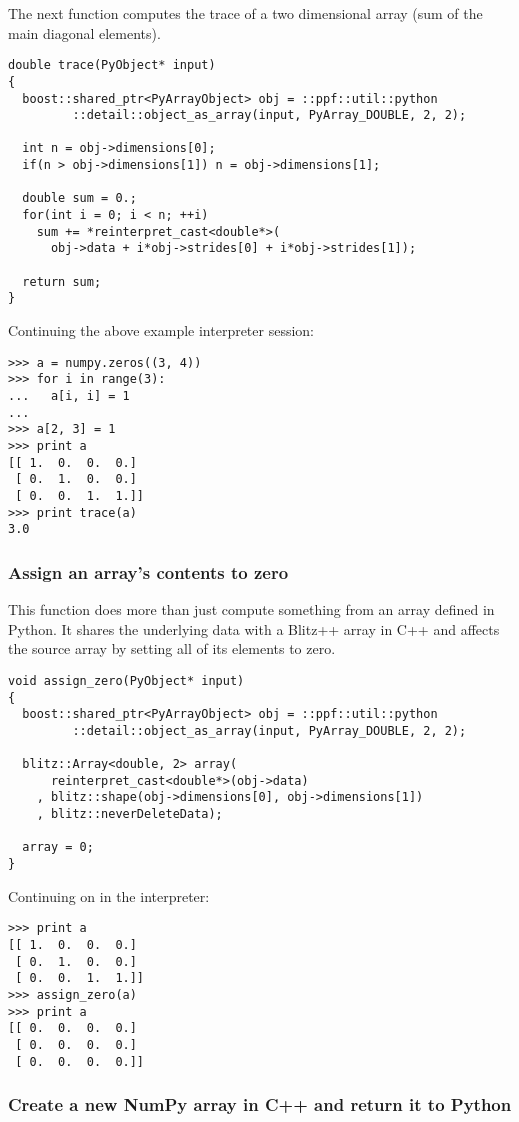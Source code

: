 The next function computes the trace of a two dimensional array
(sum of the main diagonal elements).
\begin{verbatim}
double trace(PyObject* input)
{
  boost::shared_ptr<PyArrayObject> obj = ::ppf::util::python
         ::detail::object_as_array(input, PyArray_DOUBLE, 2, 2);

  int n = obj->dimensions[0];
  if(n > obj->dimensions[1]) n = obj->dimensions[1];

  double sum = 0.;
  for(int i = 0; i < n; ++i)
    sum += *reinterpret_cast<double*>(
      obj->data + i*obj->strides[0] + i*obj->strides[1]);

  return sum;
}
\end{verbatim}
Continuing the above example interpreter session:
\begin{verbatim}
>>> a = numpy.zeros((3, 4))
>>> for i in range(3):
...   a[i, i] = 1
... 
>>> a[2, 3] = 1
>>> print a
[[ 1.  0.  0.  0.]
 [ 0.  1.  0.  0.]
 [ 0.  0.  1.  1.]]
>>> print trace(a)
3.0
\end{verbatim}

\subsubsection{Assign an array's contents to zero}

This function does more than just compute something from an array
defined in Python. It shares the underlying data with a Blitz++ array
in C++ and affects the source array by setting all of its elements to
zero.
\begin{verbatim}
void assign_zero(PyObject* input)
{
  boost::shared_ptr<PyArrayObject> obj = ::ppf::util::python
         ::detail::object_as_array(input, PyArray_DOUBLE, 2, 2);

  blitz::Array<double, 2> array(
      reinterpret_cast<double*>(obj->data)
    , blitz::shape(obj->dimensions[0], obj->dimensions[1])
    , blitz::neverDeleteData);

  array = 0;
}
\end{verbatim}
Continuing on in the interpreter:
\begin{verbatim}
>>> print a
[[ 1.  0.  0.  0.]
 [ 0.  1.  0.  0.]
 [ 0.  0.  1.  1.]]
>>> assign_zero(a)
>>> print a
[[ 0.  0.  0.  0.]
 [ 0.  0.  0.  0.]
 [ 0.  0.  0.  0.]]
\end{verbatim}

\subsubsection{Create a new NumPy array in C++ and return it to Python}

